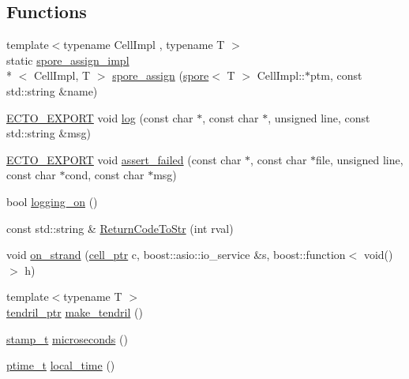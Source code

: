 \subsection*{Functions}
\begin{DoxyCompactItemize}
\item 
{\footnotesize template$<$typename Cell\-Impl , typename T $>$ }\\static \hyperlink{structecto_1_1spore__assign__impl}{spore\-\_\-assign\-\_\-impl}\\*
$<$ Cell\-Impl, T $>$ \hyperlink{namespaceecto_a776138cb830340922312c3ec98c15b6d}{spore\-\_\-assign} (\hyperlink{structecto_1_1spore}{spore}$<$ T $>$ Cell\-Impl\-::$\ast$ptm, const std\-::string \&name)
\item 
\hyperlink{util_8hpp_ab55b7868679cda60fc162580957fb98c}{E\-C\-T\-O\-\_\-\-E\-X\-P\-O\-R\-T} void \hyperlink{namespaceecto_a3870bebbdf6a0d01f28424e402be2834}{log} (const char $\ast$, const char $\ast$, unsigned line, const std\-::string \&msg)
\item 
\hyperlink{util_8hpp_ab55b7868679cda60fc162580957fb98c}{E\-C\-T\-O\-\_\-\-E\-X\-P\-O\-R\-T} void \hyperlink{namespaceecto_af79493e380ac31e886186e2ba1a1b809}{assert\-\_\-failed} (const char $\ast$, const char $\ast$file, unsigned line, const char $\ast$cond, const char $\ast$msg)
\item 
bool \hyperlink{namespaceecto_a34c1f436c47dc08392c8248632cde6f0}{logging\-\_\-on} ()
\item 
const std\-::string \& \hyperlink{namespaceecto_a7300f29f56aab7f09d11060432ad081e}{Return\-Code\-To\-Str} (int rval)
\item 
void \hyperlink{namespaceecto_a653dab75b6cd892233b9f3676a5d2921}{on\-\_\-strand} (\hyperlink{namespaceecto_aed1809e82b9229ea81ef9ee3438cf62c}{cell\-\_\-ptr} c, boost\-::asio\-::io\-\_\-service \&s, boost\-::function$<$ void()$>$ h)
\item 
{\footnotesize template$<$typename T $>$ }\\\hyperlink{namespaceecto_a84fb5f6130275382e5cbeb5fdececa78}{tendril\-\_\-ptr} \hyperlink{namespaceecto_af284ea4dc605a1d2e037731e5f35eeaa}{make\-\_\-tendril} ()
\item 
\hyperlink{namespaceecto_a96ba8fa498cc4b8e2a0217a9e236b50d}{stamp\-\_\-t} \hyperlink{namespaceecto_af5e1929b12d596f7cc45a3fe7c76c5ed}{microseconds} ()
\item 
\hyperlink{namespaceecto_a5bbe8fb0da047cb18d92eb9dfb469652}{ptime\-\_\-t} \hyperlink{namespaceecto_a67829007171203782a69bde851cb1dc6}{local\-\_\-time} ()

\end{DoxyCompactItemize}
